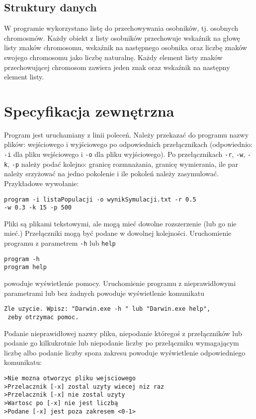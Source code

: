 \documentclass[12pt,a4paper]{article}
\begin{document}
\subsection{Struktury danych}
W programie wykorzystano listę do przechowywania osobników, tj. osobnych chromosmów.
Każdy obiekt z listy osobników przechowuje wskaźnik na głowę listy znaków chromosomu, wskaźnik na następnego osobnika oraz liczbę znaków swojego chromosomu jako liczbę naturalnę.
Każdy element listy znaków przechowującej chromosom zawiera jeden znak oraz wskaźnik na następny element listy.
\section{Specyfikacja zewnętrzna}
\label{sec:sp:zewnetrzna}
Program jest uruchamiany z linii poleceń.
Należy przekazać do programu nazwy plików: wejściowego i wyjściowego po odpowiednich przełącznikach (odpowiednio: \texttt{-i} dla pliku wejściowego i \texttt{-o} dla pliku wyjściowego). Po przełącznikach \texttt{-r}, \texttt{-w}, \texttt{-k}, \texttt{-p} należy podać kolejno: granicę rozmnażania, granicę wymierania, ile par należy srzyżować na jedno pokolenie i ile pokoleń należy zasymulować. Przykładowe wywołanie:
\begin{verbatim}
program -i listaPopulacji -o wynikSymulacji.txt -r 0.5 
-w 0.3 -k 15 -p 500
\end{verbatim}
Pliki są plikami tekstowymi, ale mogą mieć dowolne rozszerzenie (lub go nie mieć.) Przełączniki mogą być podane w dowolnej kolejności. Uruchomienie programu z parametrem \texttt{-h} lub \texttt{help}  
\begin{verbatim}
program -h
program help
\end{verbatim}
powoduje wyświetlenie pomocy. Uruchomienie programu z nieprawidłowymi parametrami lub bez żadnych powoduje wyświetlenie komunikatu 
\begin{verbatim}
Zle uzycie. Wpisz: "Darwin.exe -h " lub "Darwin.exe help",
 zeby otrzymac pomoc.
\end{verbatim}
Podanie nieprawidłowej nazwy pliku, niepodanie któregoś z przełączników lub podanie go kilkukrotnie lub niepodanie liczby po przełączniku wymagającym liczbę albo podanie liczby spoza zakresu powoduje wyświetlenie odpowiedniego komunikatu:
\begin{verbatim}
>Nie mozna otworzyc pliku wejsciowego
>Przelacznik [-x] zostal uzyty wiecej niz raz
>Przelacznik [-x] nie zostal uzyty
>Wartosc po [-x] nie jest liczbą	
>Podane [-x] jest poza zakresem <0-1>
\end{verbatim}
\end{document}
